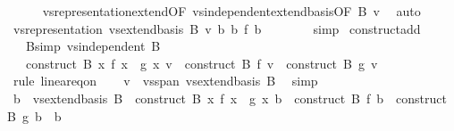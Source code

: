 \begin{isabellebody}
\ \ \ \ \isamarkupfalse%
\ vs{}{\isachardot}{\kern0pt}representation{\isacharunderscore}{\kern0pt}extend{\isacharbrackleft}{\kern0pt}OF\ vs{}{\isachardot}{\kern0pt}independent{\isacharunderscore}{\kern0pt}extend{\isacharunderscore}{\kern0pt}basis{\isacharbrackleft}{\kern0pt}OF\ B{\isacharbrackright}{\kern0pt}\ v{\isacharbrackright}{\kern0pt}\ \isamarkupfalse%
\ auto\isanewline
\ \ \isamarkupfalse%
\ \isamarkupfalse%
\ {\isachardoublequoteopen}vs{}{\isachardot}{\kern0pt}representation\ {\isacharparenleft}{\kern0pt}vs{}{\isachardot}{\kern0pt}extend{\isacharunderscore}{\kern0pt}basis\ B{\isacharparenright}{\kern0pt}\ v\ b\ {\isacharasterisk}{\kern0pt}b\ f\ b\ {\isacharequal}{\kern0pt}\ {}{\isachardoublequoteclose}\isanewline
\ \ \ \ \isamarkupfalse%
\ simp\isanewline
{}\isamarkupfalse%
%
\endisatagproof
{\isafoldproof}%
%
\isadelimproof
\isanewline
%
\endisadelimproof
\isanewline
{}\isamarkupfalse%
\ construct{\isacharunderscore}{\kern0pt}add{\isacharcolon}{\kern0pt}\isanewline
\ \ \ B{\isacharbrackleft}{\kern0pt}simp{\isacharbrackright}{\kern0pt}{\isacharcolon}{\kern0pt}\ {\isachardoublequoteopen}vs{}{\isachardot}{\kern0pt}independent\ B{\isachardoublequoteclose}\isanewline
\ \ \ {\isachardoublequoteopen}construct\ B\ {\isacharparenleft}{\kern0pt}{\isasymlambda}x{\isachardot}{\kern0pt}\ f\ x\ {\isacharplus}{\kern0pt}\ g\ x{\isacharparenright}{\kern0pt}\ v\ {\isacharequal}{\kern0pt}\ construct\ B\ f\ v\ {\isacharplus}{\kern0pt}\ construct\ B\ g\ v{\isachardoublequoteclose}\isanewline
%
\isadelimproof
%
\endisadelimproof
%
\isatagproof
{}\isamarkupfalse%
\ {\isacharparenleft}{\kern0pt}rule\ linear{\isacharunderscore}{\kern0pt}eq{\isacharunderscore}{\kern0pt}on{\isacharparenright}{\kern0pt}\isanewline
\ \ \isamarkupfalse%
\ {\isachardoublequoteopen}v\ {\isasymin}\ vs{}{\isachardot}{\kern0pt}span\ {\isacharparenleft}{\kern0pt}vs{}{\isachardot}{\kern0pt}extend{\isacharunderscore}{\kern0pt}basis\ B{\isacharparenright}{\kern0pt}{\isachardoublequoteclose}\ \isamarkupfalse%
\ simp\isanewline
\ \ \isamarkupfalse%
\ {\isachardoublequoteopen}b\ {\isasymin}\ vs{}{\isachardot}{\kern0pt}extend{\isacharunderscore}{\kern0pt}basis\ B\ {\isasymLongrightarrow}\ construct\ B\ {\isacharparenleft}{\kern0pt}{\isasymlambda}x{\isachardot}{\kern0pt}\ f\ x\ {\isacharplus}{\kern0pt}\ g\ x{\isacharparenright}{\kern0pt}\ b\ {\isacharequal}{\kern0pt}\ construct\ B\ f\ b\ {\isacharplus}{\kern0pt}\ construct\ B\ g\ b{\isachardoublequoteclose}\ \ b\isanewline

\end{isabellebody}
